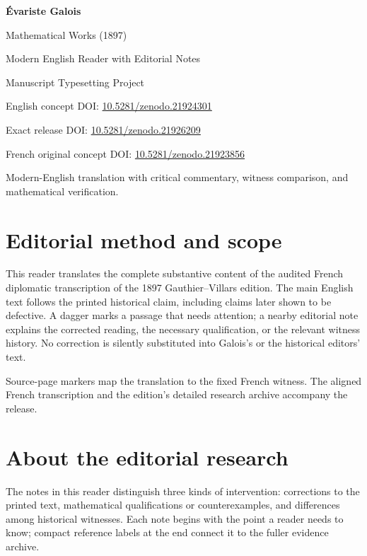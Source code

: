 \documentclass[11pt,oneside,openany]{book}
\begin{document}
\begin{titlepage}
\centering
\vspace*{0.11\textheight}
{\Huge\bfseries Évariste Galois\par}
\vspace{1.5em}
{\LARGE Mathematical Works (1897)\par}
\vspace{0.7em}
{\Large Modern English Reader with Editorial Notes\par}
\vfill
{\large Manuscript Typesetting Project\par}
\vspace{1em}
{\small English concept DOI: \href{https://doi.org/10.5281/zenodo.21924301}{10.5281/zenodo.21924301}\par}
  {\small Exact release DOI: \href{https://doi.org/10.5281/zenodo.21926209}{10.5281/zenodo.21926209}\par}
{\small French original concept DOI: \href{https://doi.org/10.5281/zenodo.21923856}{10.5281/zenodo.21923856}\par}
\vspace{2em}
  {\footnotesize Modern-English translation with critical commentary, witness comparison, and mathematical verification.\par}
\end{titlepage}
\clearpage
\frontmatter
\chapter*{Editorial method and scope}
This reader translates the complete substantive content of the audited French diplomatic transcription of the 1897 Gauthier--Villars edition. The main English text follows the printed historical claim, including claims later shown to be defective. A dagger marks a passage that needs attention; a nearby editorial note explains the corrected reading, the necessary qualification, or the relevant witness history. No correction is silently substituted into Galois's or the historical editors' text.

Source-page markers map the translation to the fixed French witness. The aligned French transcription and the edition's detailed research archive accompany the release.

\chapter*{About the editorial research}
The notes in this reader distinguish three kinds of intervention: corrections to the printed text, mathematical qualifications or counterexamples, and differences among historical witnesses. Each note begins with the point a reader needs to know; compact reference labels at the end connect it to the fuller evidence archive.
\end{document}
